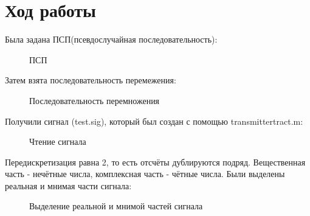 \documentclass[a4paper,14pt]{extarticle}
\begin{document}
\section{Ход работы}

Была задана ПСП(псевдослучайная последовательность):

\begin{figure}[H]
\caption{ПСП}
\label{1}
\end{figure}

Затем взята последовательность перемежения:

\begin{figure}[H]
\caption{Последовательность перемножения}
\label{2}
\end{figure}

Получили сигнал (test.sig), который был создан с помощью transmittertract.m:

\begin{figure}[H]
\caption{Чтение сигнала}
\label{3}
\end{figure}

Передискретизация равна 2, то есть отсчёты дублируются подряд.
Вещественная часть - нечётные числа, комплексная часть - чётные числа.
Были выделены реальная и мнимая части сигнала:

\begin{figure}[H]
\caption{Выделение реальной и мнимой частей сигнала}
\label{4}
\end{figure}
\end{document}
